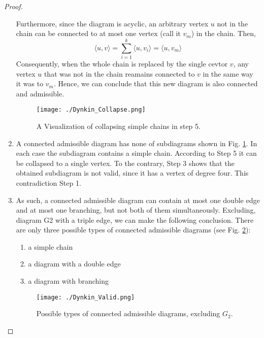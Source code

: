 \begin{proof}
\begin{enumerate}
        Furthermore, since the diagram is acyclic, an arbitrary vertex $u$ not in the chain can be connected  to at most one vertex 
        (call it $v_m$) in the chain. Then,
            \begin{equation*}
                \langle u, v \rangle = \sum_{i=1}^{k} \langle u, v_i\rangle = \langle u, v_m \rangle
            \end{equation*}
        Consequently, when the whole chain is replaced by the single cevtor $v$, any vertex $u$ that was not in the chain reamains connected
        to $v$ in the same way it was to $v_m$. Hence, we can conclude that this new diagram is also connected and admissible.
        
        \begin{figure}
            \centering
            \texttt{[image: ./Dynkin\_Collapse.png]}
            \label{img:collapse}
            \caption{A Visualization of collapsing simple chains in step 5.}
        \end{figure}
    
        \item A connected admissible diagram has none of subdiagrams shown in Fig. \ref{img:collapse}.
        In each case the subdiagram contains a simple chain.
        According to Step 5 it can be collapsed to a single vertex. To the contrary, Step 3 shows that the obtained subdiagram is not
        valid, since it has a vertex of degree four. This contradiction Step 1.

        \item As such, a connected admissible diagram can contain at most one double edge and at most one branching, but not both
        of them simultaneously. Excluding, diagram G2 with a triple edge, we can make the following conclusion.
        There are only three possible types of connected admissible diagrams (see Fig. \ref{img:valid}):
        
        \begin{enumerate}[start=1,label={\bfseries T\arabic*:}]
            \item a simple chain
            \item a diagram with a double edge
            \item a diagram with branching
        \end{enumerate}
    
        \begin{figure}[h]
            \centering
            \texttt{[image: ./Dynkin\_Valid.png]}
            \caption{Possible types of connected admissible diagrams, excluding $G_2$.}
            \label{img:valid}
        \end{figure}


\end{enumerate}
\end{proof}
